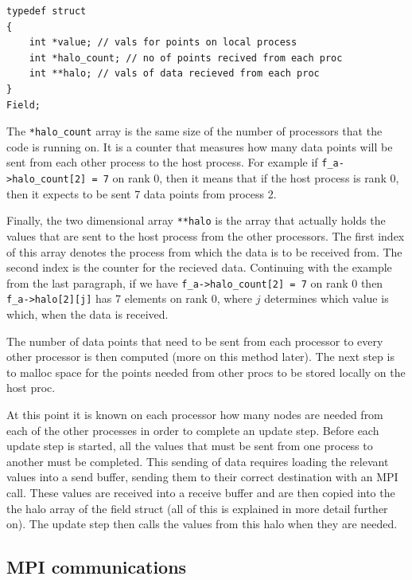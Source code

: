 \documentclass[pdftex,12pt,a4paper]{article}
\begin{document}
\begin{lstlisting}
typedef struct
{
	int *value;	// vals for points on local process
	int *halo_count; // no of points recived from each proc
	int **halo;	// vals of data recieved from each proc	
}
Field;
\end{lstlisting}

The \verb|*halo_count| array is the same size of the number of processors that the code is running on. It is a counter that measures how many data points will be sent from each other process to the host process. For example if \verb|f_a->halo_count[2] = 7| on rank 0, then it means that if the host process is rank 0, then it expects to be sent 7 data points from process 2.

Finally, the two dimensional array \verb|**halo| is the array that actually holds the values that are sent to the host process from the other processors. The first index of this array denotes the process from which the data is to be received from. The second index is the counter for the recieved data. Continuing with the example from the last paragraph, if we have \verb|f_a->halo_count[2] = 7| on rank 0 then \verb|f_a->halo[2][j]| has 7 elements on rank 0, where $j$ determines which value is which, when the data is received.

The number of data points that need to be sent from each processor to every other processor is then computed (more on this method later). The next step is to malloc space for the points needed from other procs to be stored locally on the host proc.

At this point it is known on each processor how many nodes are needed from each of the other processes in order to complete an update step. Before each update step is started, all the values that must be sent from one process to another must be completed. This sending of data requires loading the relevant values into a send buffer, sending them to their correct destination with an MPI call. These values are received into a receive buffer and are then copied into the the halo array of the field struct (all of this is explained in more detail further on). The update step then calls the values from this halo when they are needed.




\subsection{MPI communications}


\end{document}
